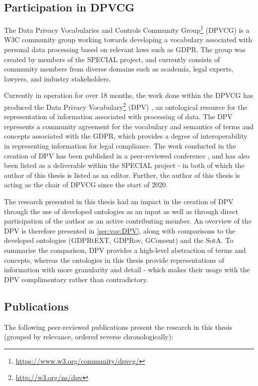\subsection{Participation in DPVCG}\label{sec:intro:dpvcg}
The Data Privacy Vocabularies and Controls Community Group\footnote{\url{https://www.w3.org/community/dpvcg/}} (DPVCG) is a W3C community group working towards developing a vocabulary associated with personal data processing based on relevant laws such as GDPR.
The group was created by members of the SPECIAL project, and currently consists of community members from diverse domains such as academia, legal experts, lawyers, and industry stakeholders.

Currently in operation for over 18 months, the work done within the DPVCG has produced the Data Privacy Vocabulary\footnote{\url{http://w3.org/ns/dpv}} (DPV) , an ontological resource for the representation of information associated with processing of data.
The DPV represents a community agreement for the vocabulary and semantics of terms and concepts associated with the GDPR, which provides a degree of interoperability in representing information for legal compliance.
The work conducted in the creation of DPV has been published in a peer-reviewed conference \cite{pandit_dpv_2019}, and has also been listed as a deliverable within the SPECIAL project \cite{pandit_d6.5_2019} - in both of which the author of this thesis is listed as an editor.
Further, the author of this thesis is acting as the chair of DPVCG since the start of 2020.

The research presented in this thesis had an impact in the creation of DPV through the use of developed ontologies as an input as well as through direct participation of the author as an active contributing member.
An overview of the DPV is therefore presented in \autoref{sec:voc:DPV}, along with comparisons to the developed ontologies (GDPRtEXT, GDPRov, GConsent) and the SotA.
To summarise the comparison, DPV provides a high-level abstraction of terms and concepts, whereas the ontologies in this thesis provide representations of information with more granularity and detail - which makes their usage with the DPV complimentary rather than contradictory.

\subsection{Publications}\label{sec:intro:publications}
The following peer-reviewed publications present the research in this thesis (grouped by relevance, ordered reverse chronologically):

